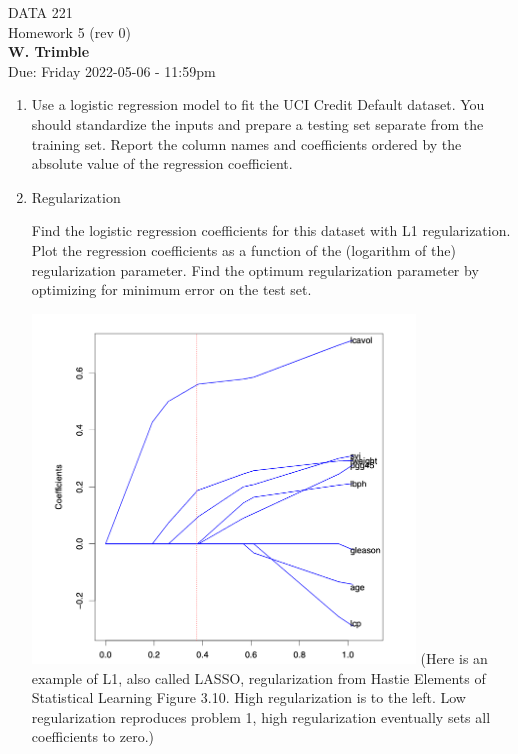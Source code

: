 \documentclass[12pt]{book}
\theoremstyle{definition}
\begin{document}
\begin{center}
{\Large DATA 221 \\  Homework 5  (rev 0)}\\
\textbf{W. Trimble}\\ %
Due: Friday 2022-05-06  - 11:59pm
\end{center}

\vspace{0.2 cm}



\begin{enumerate}

\item
Use a logistic regression model to fit the UCI Credit Default dataset.  You should standardize the inputs and prepare a testing set separate from the training set.
Report the column names and coefficients ordered by the absolute value of the regression coefficient.

\item
Regularization 

Find the logistic regression coefficients for this dataset with L1 regularization.  
Plot the regression coefficients as a function of the (logarithm of the) regularization parameter.
Find the optimum regularization parameter by optimizing for minimum error on the test set.

\includegraphics[width=4in]{HASTIE-LASSO.png}
(Here is an example of L1, also called LASSO, regularization from Hastie Elements of Statistical Learning Figure 3.10. 
High regularization is to the left.  Low regularization reproduces problem 1, high regularization eventually sets all
coefficients to zero.)


\end{enumerate}
\end{document}
